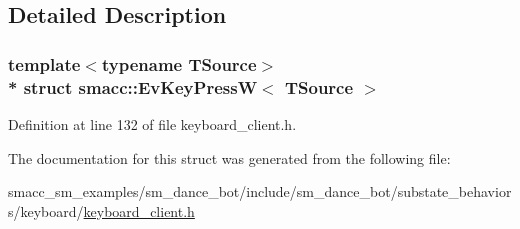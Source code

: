 \subsection{Detailed Description}
\subsubsection*{template$<$typename T\+Source$>$\\*
struct smacc\+::\+Ev\+Key\+Press\+W$<$ T\+Source $>$}



Definition at line 132 of file keyboard\+\_\+client.\+h.



The documentation for this struct was generated from the following file\+:\begin{DoxyCompactItemize}
\item 
smacc\+\_\+sm\+\_\+examples/sm\+\_\+dance\+\_\+bot/include/sm\+\_\+dance\+\_\+bot/substate\+\_\+behaviors/keyboard/\hyperlink{keyboard__client_8h}{keyboard\+\_\+client.\+h}\end{DoxyCompactItemize}

